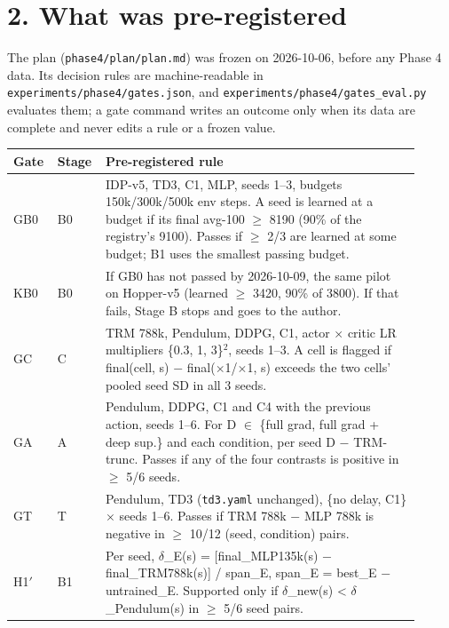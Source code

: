 \documentclass[11pt]{article}
\begin{document}
\section*{2. What was pre-registered}



The plan (\texttt{phase4/\allowbreak{}plan/\allowbreak{}plan.\allowbreak{}md}) was frozen on 2026-10-06, before any Phase 4 data. Its decision rules are machine-readable in \texttt{experiments/\allowbreak{}phase4/\allowbreak{}gates.\allowbreak{}json}, and \texttt{experiments/\allowbreak{}phase4/\allowbreak{}gates\_\allowbreak{}eval.\allowbreak{}py} evaluates them; a gate command writes an outcome only when its data are complete and never edits a rule or a frozen value.



\begin{center}\small\begin{tabular}{>{\raggedright\arraybackslash}p{0.081\linewidth}>{\raggedright\arraybackslash}p{0.081\linewidth}>{\raggedright\arraybackslash}p{0.744\linewidth}}
\toprule
Gate & Stage & Pre-registered rule \\
\midrule
GB0 & B0 & IDP-v5, TD3, C1, MLP, seeds 1--3, budgets 150k/300k/500k env steps. A seed is learned at a budget if its final avg-100 $\geq$ 8190 (90\% of the registry's 9100). Passes if $\geq$ 2/3 are learned at some budget; B1 uses the smallest passing budget. \\
KB0 & B0 & If GB0 has not passed by 2026-10-09, the same pilot on Hopper-v5 (learned $\geq$ 3420, 90\% of 3800). If that fails, Stage B stops and goes to the author. \\
GC & C & TRM 788k, Pendulum, DDPG, C1, actor $\times$ critic LR multipliers \{0.3, 1, 3\}$^2$, seeds 1--3. A cell is flagged if final(cell, s) $-$ final($\times$1/$\times$1, s) exceeds the two cells' pooled seed SD in all 3 seeds. \\
GA & A & Pendulum, DDPG, C1 and C4 with the previous action, seeds 1--6. For D $\in$ \{full grad, full grad + deep sup.\} and each condition, per seed D $-$ TRM-trunc. Passes if any of the four contrasts is positive in $\geq$ 5/6 seeds. \\
GT & T & Pendulum, TD3 (\texttt{td3.yaml} unchanged), \{no delay, C1\} $\times$ seeds 1--6. Passes if TRM 788k $-$ MLP 788k is negative in $\geq$ 10/12 (seed, condition) pairs. \\
H1$'$ & B1 & Per seed, $\delta$\_E(s) = [final\_MLP135k(s) $-$ final\_TRM788k(s)] / span\_E, span\_E = best\_E $-$ untrained\_E. Supported only if $\delta$\_new(s) < $\delta$\_Pendulum(s) in $\geq$ 5/6 seed pairs. \\
\bottomrule
\end{tabular}\end{center}
\end{document}
